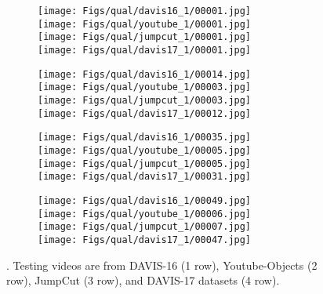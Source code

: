 \setlength{\figwidth}{0.25\textwidth}
\begin{figure}[t]
\begin{center}
		\begin{subfigure}[b]{0.98\figwidth}\texttt{[image: Figs/qual/davis16\_1/00001.jpg]} \\
\texttt{[image: Figs/qual/youtube\_1/00001.jpg]} \\
\texttt{[image: Figs/qual/jumpcut\_1/00001.jpg]} \\
\texttt{[image: Figs/qual/davis17\_1/00001.jpg]} \\
\end{subfigure}\hfill
		\begin{subfigure}[b]{0.98\figwidth}\texttt{[image: Figs/qual/davis16\_1/00014.jpg]} \\
\texttt{[image: Figs/qual/youtube\_1/00003.jpg]} \\
\texttt{[image: Figs/qual/jumpcut\_1/00003.jpg]} \\
\texttt{[image: Figs/qual/davis17\_1/00012.jpg]} \\
\end{subfigure}\hfill
		\begin{subfigure}[b]{0.98\figwidth}\texttt{[image: Figs/qual/davis16\_1/00035.jpg]} \\
\texttt{[image: Figs/qual/youtube\_1/00005.jpg]} \\
\texttt{[image: Figs/qual/jumpcut\_1/00005.jpg]} \\
\texttt{[image: Figs/qual/davis17\_1/00031.jpg]} \\
\end{subfigure}\hfill
		\begin{subfigure}[b]{0.98\figwidth}\texttt{[image: Figs/qual/davis16\_1/00049.jpg]} \\
\texttt{[image: Figs/qual/youtube\_1/00006.jpg]} \\
\texttt{[image: Figs/qual/jumpcut\_1/00007.jpg]} \\
\texttt{[image: Figs/qual/davis17\_1/00047.jpg]} \\
\end{subfigure}
	\end{center}
\caption{. Testing videos are from DAVIS-16 (1 row), Youtube-Objects (2 row), JumpCut (3 row),  and DAVIS-17  datasets (4 row).
}
\end{figure}
